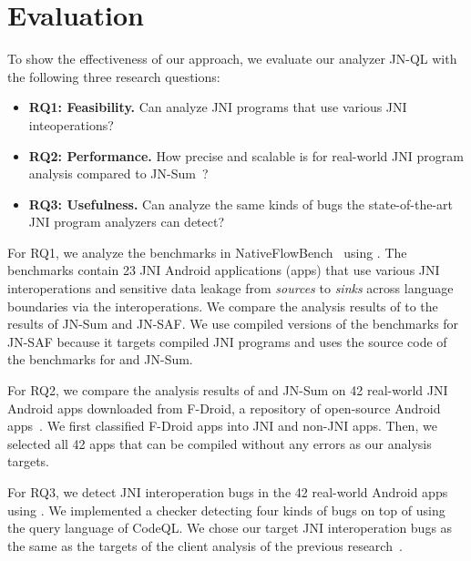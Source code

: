 \newcommand{\req}[1]{RQ#1}


\section{Evaluation}\label{sec:eval}

To show the effectiveness of our approach, we evaluate our analyzer
JN-QL with the following three research questions:
\begin{itemize}
  \item \textbf{\req{1}: Feasibility.} Can \ours analyze JNI programs that use
    various JNI inteoperations?

  \item \textbf{\req{2}: Performance.} How precise and scalable is \ours for
    real-world JNI program analysis compared to JN-Sum~\cite{LeeASE20}?

  \item \textbf{\req{3}: Usefulness.} Can \ours analyze the same kinds of bugs
    the state-of-the-art JNI program analyzers can detect?
\end{itemize}

For \req{1}, we analyze the benchmarks in NativeFlowBench~\cite{nativeflowbench,
JN-SAF} using \ours. The benchmarks contain 23 JNI Android applications (apps) that
use various JNI interoperations and sensitive data leakage from {\it sources} to
{\it sinks} across language boundaries via the interoperations. We compare
the analysis results of \ours to the results of JN-Sum and JN-SAF. We use
compiled versions of the benchmarks for JN-SAF because it targets compiled JNI
programs and uses the source code of the benchmarks for \ours and JN-Sum.

For \req{2}, we compare the analysis results of \ours and JN-Sum on 42
real-world JNI Android apps downloaded from F-Droid, a repository of
open-source Android apps~\cite{fdroid}. We first classified
F-Droid apps into JNI and non-JNI apps. Then, we selected
all 42 apps that can be compiled without any errors as our analysis targets.

For \req{3}, we detect JNI interoperation bugs in the 42 real-world Android
apps using \ours. We implemented a checker detecting four kinds of
bugs on top of \ours using the query language of CodeQL. We chose our target
JNI interoperation bugs as the same as the targets of the client
analysis of the previous research~\cite{LeeASE20, ILEA}.


